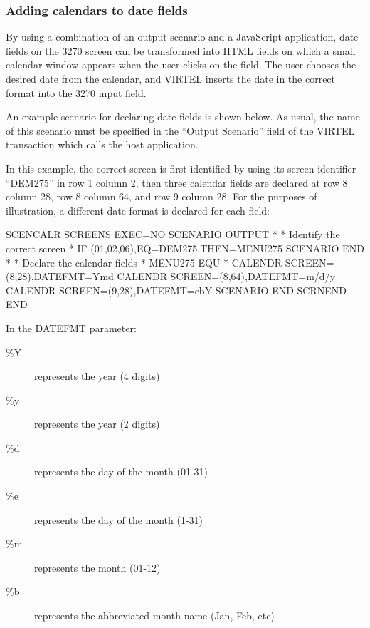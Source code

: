 \documentclass[letterpaper,10pt,english]{sphinxmanual}
\begin{document}


\subsubsection{Adding calendars to date fields}
\label{\detokenize{User_Guide:adding-calendars-to-date-fields}}
By using a combination of an output scenario and a JavaScript application, date fields on the 3270 screen can be
transformed into HTML fields on which a small calendar window appears when the user clicks on the field. The user
chooses the desired date from the calendar, and VIRTEL inserts the date in the correct format into the 3270 input field.

An example scenario for declaring date fields is shown below. As usual, the name of this scenario must be specified in
the “Output Scenario” field of the VIRTEL transaction which calls the host application.

In this example, the correct screen is first identified by using its screen identifier “DEM275” in row 1 column 2, then
three calendar fields are declared at row 8 column 28, row 8 column 64, and row 9 column 28. For the purposes of
illustration, a different date format is declared for each field:

\begin{sphinxVerbatim}[commandchars=\\\{\}]
SCENCALR    SCREENS EXEC=NO
            SCENARIO OUTPUT
*
* Identify the correct screen
*
            IF\PYGZdl{} (01,02,06),EQ=\PYGZsq{}DEM275\PYGZsq{},THEN=MENU275
            SCENARIO END
*
* Declare the calendar fields
*
MENU275 EQU *
        CALENDR\PYGZdl{} SCREEN=(8,28),DATEFMT=\PYGZsq{}\PYGZpc{}Y\PYGZpc{}m\PYGZpc{}d\PYGZsq{}
        CALENDR\PYGZdl{} SCREEN=(8,64),DATEFMT=\PYGZsq{}\PYGZpc{}m/\PYGZpc{}d/\PYGZpc{}y\PYGZsq{}
        CALENDR\PYGZdl{} SCREEN=(9,28),DATEFMT=\PYGZsq{}\PYGZpc{}e\PYGZhy{}\PYGZpc{}b\PYGZhy{}\PYGZpc{}Y\PYGZsq{}
SCENARIO END
SCRNEND
END
\end{sphinxVerbatim}


In the DATEFMT parameter:
\begin{description}
\item[{\%Y}] \leavevmode
represents the year (4 digits)

\item[{\%y}] \leavevmode
represents the year (2 digits)

\item[{\%d}] \leavevmode
represents the day of the month (01-31)

\item[{\%e}] \leavevmode
represents the day of the month (1-31)

\item[{\%m}] \leavevmode
represents the month (01-12)

\item[{\%b}] \leavevmode
represents the abbreviated month name (Jan, Feb, etc)

\end{description}
\end{document}
